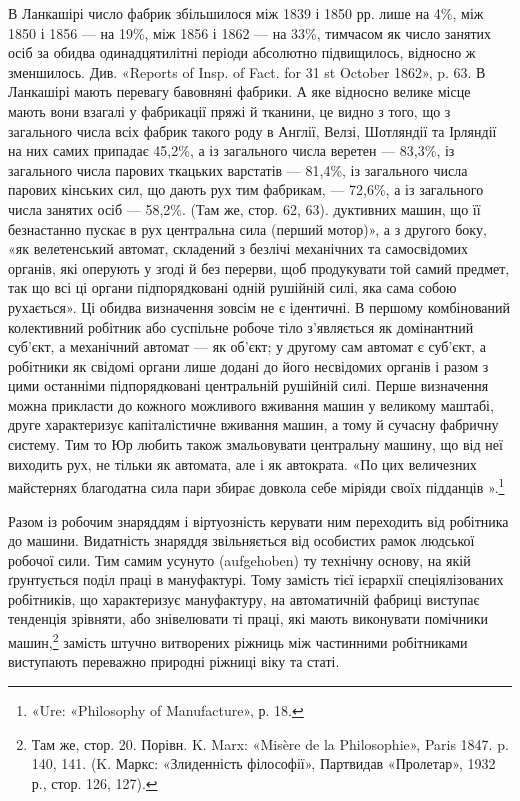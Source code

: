 В Ланкашірі число фабрик збільшилося між 1839 і 1850 рр. лише на
4\%, між 1850 і 1856 — на 19\%, між 1856 і 1862 — на 33\%, тимчасом
як число занятих осіб за обидва одинадцятилітні періоди абсолютно підвищилось,
відносно ж зменшилось. Див. «Reports of Insp. of Fact. for
31 st October 1862», p. 63. В Ланкашірі мають перевагу бавовняні фабрики.
А яке відносно велике місце мають вони взагалі у фабрикації пряжі й
тканини, це видно з того, що з загального числа всіх фабрик такого роду
в Англії, Велзі, Шотляндії та Ірляндії на них самих припадає 45,2\%, а із
загального числа веретен — 83,3\%, із загального числа парових ткацьких
варстатів — 81,4\%, із загального числа парових кінських сил, що дають
рух тим фабрикам, — 72,6\%, а із загального числа занятих осіб — 58,2\%.
(Там же, стор. 62, 63).
дуктивних машин, що її безнастанно пускає в рух центральна
сила (перший мотор)», а з другого боку, «як велетенський автомат,
складений з безлічі механічних та самосвідомих органів,
які оперують у згоді й без перерви, щоб продукувати той самий
предмет, так що всі ці органи підпорядковані одній рушійній
силі, яка сама собою рухається». Ці обидва визначення зовсім
не є ідентичні. В першому комбінований колективний робітник
або суспільне робоче тіло з’являється як домінантний суб’єкт,
а механічний автомат — як об’єкт; у другому сам автомат є
суб’єкт, а робітники як свідомі органи лише додані до його
несвідомих органів і разом з цими останніми підпорядковані
центральній рушійній силі. Перше визначення можна прикласти
до кожного можливого вживання машин у великому маштабі,
друге характеризує капіталістичне вживання машин, а тому й
сучасну фабричну систему. Тим то Юр любить також змальовувати
центральну машину, що від неї виходить рух, не тільки як
автомата, але і як автократа. «По цих величезних майстернях
благодатна сила пари збирає довкола себе міріяди своїх підданців
».\footnote{
«Ure: «Philosophy of Manufacture», р. 18.
}

Разом із робочим знаряддям і віртуозність керувати ним
переходить від робітника до машини. Видатність знаряддя звільняється
від особистих рамок людської робочої сили. Тим самим
усунуто (aufgehoben) ту технічну основу, на якій ґрунтується
поділ праці в мануфактурі. Тому замість тієї ієрархії спеціялізованих
робітників, що характеризує мануфактуру, на автоматичній
фабриці виступає тенденція зрівняти, або знівелювати ті
праці, які мають виконувати помічники машин,\footnote{
Там же, стор. 20. Порівн. K. Marx: «Misère de la Philosophie»,
Paris 1847. p. 140, 141. (K. Маркс: «Злиденність філософії», Партвидав
«Пролетар», 1932 р., стор. 126, 127).
} замість штучно
витворених ріжниць між частинними робітниками виступають
переважно природні ріжниці віку та статі.

